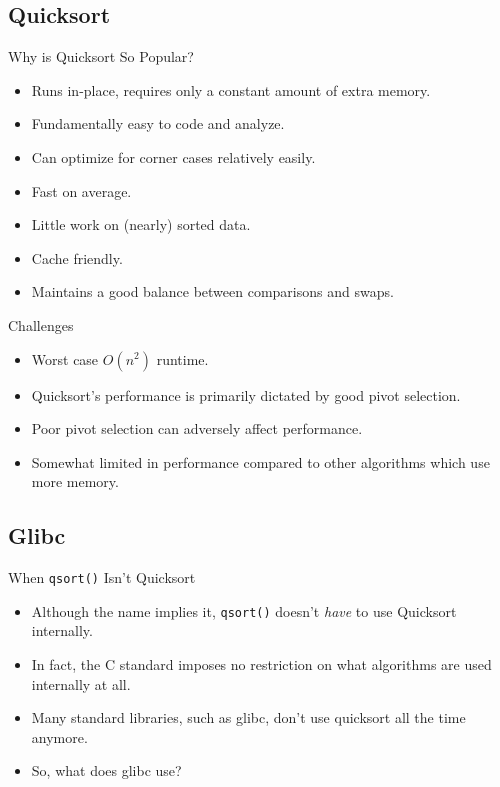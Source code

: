 \documentclass[13pt]{beamer}
\begin{document}
\subsection{Quicksort}
\begin{frame}{Why is Quicksort So Popular?}
	\pause
	\begin{itemize}[<+->]
		\item Runs in-place, requires only a constant amount of extra memory.
		\item Fundamentally easy to code and analyze.
		\item Can optimize for corner cases relatively easily.
		\item Fast on average.
		\item Little work on (nearly) sorted data.
		\item Cache friendly.
		\item Maintains a good balance between comparisons and swaps.
	\end{itemize}
\end{frame}

\begin{frame}{Challenges}
	\pause
	\begin{itemize}[<+->]
		\item Worst case $O(n^{2})$ runtime.
		\item Quicksort's performance is primarily dictated by good
		      pivot selection.
		\item Poor pivot selection can adversely affect performance.
		\item Somewhat limited in performance compared to other algorithms
		      which use more memory.
	\end{itemize}
\end{frame}

\subsection{Glibc}
\begin{frame}{When \texttt{qsort()} Isn't Quicksort}
	\begin{itemize}[<+->]
		\item Although the name implies it, \texttt{qsort()} doesn't
		      \textit{have} to use Quicksort internally.
		\item In fact, the C standard imposes no restriction on what
		      algorithms are used internally at all.
		\item Many standard libraries, such as glibc, don't use quicksort
		      all the time anymore.
		\item So, what does glibc use?
	\end{itemize}
\end{frame}
\end{document}
